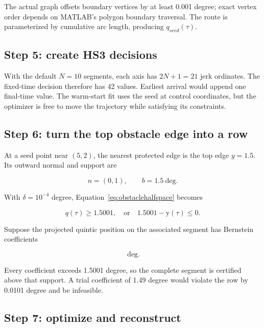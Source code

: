 \documentclass[10pt,letterpaper]{article}
\begin{document}
The actual graph offsets boundary vertices by at least 0.001 degree; exact
vertex order depends on MATLAB's polygon boundary traversal. The route is
parameterized by cumulative arc length, producing $q_{seed}(\tau)$.

\subsection{Step 5: create HS3 decisions}

With the default $N=10$ segments, each axis has $2N+1=21$ jerk ordinates.
The fixed-time decision therefore has 42 values. Earliest arrival would append
one final-time value. The warm-start fit uses the seed at control coordinates,
but the optimizer is free to move the trajectory while satisfying its
constraints.

\subsection{Step 6: turn the top obstacle edge into a row}

At a seed point near $(5,2)$, the nearest protected edge is the top edge
$y=1.5$. Its outward normal and support are

\begin{equation}
n=(0,1),\qquad b=1.5\ \mathrm{deg}.
\end{equation}

With $\delta=10^{-4}$ degree, Equation~\eqref{eq:obstaclehalfspace} becomes

\begin{equation}
[0\ \ 1]q(\tau)\ge1.5001,
\quad\text{or}\quad 1.5001-\mathrm{y}(\tau)\le0.
\end{equation}

Suppose the projected quintic position on the associated segment has
Bernstein coefficients

\begin{equation}
[2.00,1.80,1.65,1.70,1.90,2.00]\ \mathrm{deg}.
\end{equation}

Every coefficient exceeds 1.5001 degree, so the complete segment is certified
above that support. A trial coefficient of 1.49 degree would violate the row by
0.0101 degree and be infeasible.

\subsection{Step 7: optimize and reconstruct}
\end{document}
